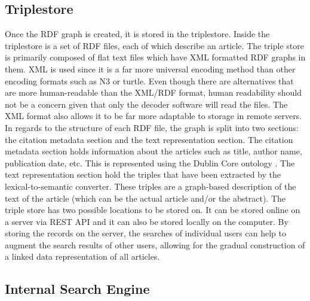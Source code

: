 \documentclass[12pt]{article}
\begin{document}
	\subsection{Triplestore}
	
	\quad Once the RDF graph is created, it is stored in the triplestore. Inside the triplestore is a set of RDF files, each of which describe an article. The triple store is primarily composed of flat text files which have XML formatted RDF graphs in them. XML is used since it is a far more universal encoding method than other encoding formats such as N3 or turtle. Even though there are alternatives that are more human-readable than the XML/RDF format, human readability should not be a concern given that only the decoder software will read the files. The XML format also allows it to be far more adaptable to storage in remote servers. In regards to the structure of each RDF file, the graph is split into two sections: the citation metadata section and the text representation section. The citation metadata section holds information about the articles such as title, author name, publication date, etc. This is represented using the Dublin Core ontology \cite{weibel1998dublin}. 
	The text representation section hold the triples that have been extracted by the lexical-to-semantic converter. These triples are a graph-based description of the text of the article (which can be the actual article and/or the abstract). The triple store has two possible locations to be stored on. It can be stored online on a server via REST API and it can also be stored locally on the computer. By storing the records on the server, the searches of individual users can help to augment the search results of other users, allowing for the gradual construction of a linked data representation of all articles. 
	
	\subsection{Internal Search Engine}
	
\end{document}
